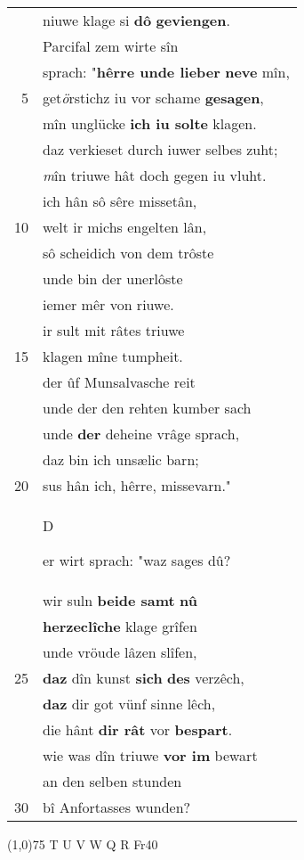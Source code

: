 \documentclass[8pt,a4paper,notitlepage]{article}
\begin{document}
\begin{table}[ht]
\begin{minipage}[t]{0.5\linewidth}
\begin{tabular}{rl}
 & niuwe klage si \textbf{dô} \textbf{geviengen}.\\ 
 & Parcifal zem wirte sîn\\ 
 & sprach: "\textbf{hêrre unde lieber} \textbf{neve} mîn,\\ 
5 & get\textit{ö}rstichz iu vor schame \textbf{gesagen},\\ 
 & mîn unglücke \textbf{ich iu solte} klagen.\\ 
 & daz verkieset durch iuwer selbes zuht;\\ 
 & \textit{m}în triuwe hât doch gegen iu vluht.\\ 
 & ich hân sô sêre missetân,\\ 
10 & welt ir michs engelten lân,\\ 
 & sô scheidich von dem trôste\\ 
 & unde bin der unerlôste\\ 
 & iemer mêr von riuwe.\\ 
 & ir sult mit râtes triuwe\\ 
15 & klagen mîne tumpheit.\\ 
 & der ûf Munsalvasche reit\\ 
 & unde der den rehten kumber sach\\ 
 & unde \textbf{der} deheine vrâge sprach,\\ 
 & daz bin ich unsælic barn;\\ 
20 & sus hân ich, hêrre, missevarn."\\ 
 & \begin{large}D\end{large}er wirt sprach: "waz sages dû?\\ 
 & wir suln \textbf{beide samt} \textbf{nû}\\ 
 & \textbf{herzeclîche} klage grîfen\\ 
 & unde vröude lâzen slîfen,\\ 
25 & \textbf{daz} dîn kunst \textbf{sich} \textbf{des} verzêch,\\ 
 & \textbf{daz} dir got vünf sinne lêch,\\ 
 & die hânt \textbf{dir rât} vor \textbf{bespart}.\\ 
 & wie was dîn triuwe \textbf{vor im} bewart\\ 
 & an den selben stunden\\ 
30 & bî Anfortasses wunden?\\ 
\end{tabular}
\scriptsize
\line(1,0){75} \newline
T U V W Q R Fr40 \newline

\end{minipage}
\end{table}
\end{document}
